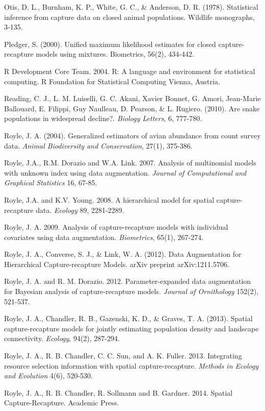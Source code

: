\documentclass{book}
\begin{document}
\rf Otis, D. L., Burnham, K. P., White, G. C., \& Anderson, D. R. (1978). Statistical inference from capture data on closed animal populations. Wildlife monographs, 3-135.

\rf Pledger, S. (2000). Unified maximum likelihood estimates for closed capture-recapture models using mixtures. Biometrics, 56(2), 434-442.

\rf R Development Core Team. 2004. R: A language and environment for statistical computing. R Foundation for Statistical Computing Vienna, Austria.

\rf Reading, C. J., L. M. Luiselli, G. C. Akani, Xavier Bonnet, G. Amori, Jean-Marie Ballouard, E. Filippi, Guy Naulleau, D. Pearson, \& L. Rugiero. (2010). Are snake populations in widespread decline?. \textit{Biology Letters}, 6, 777-780.

\rf Royle, J. A. (2004). Generalized estimators of avian abundance from count survey data. \textit{Animal Biodiversity and Conservation}, 27(1), 375-386.

\rf Royle, J.A., R.M. Dorazio and W.A. Link. 2007. Analysis of multinomial models with unknown index using data augmentation. {\it Journal of Computational and Graphical Statistics}  16, 67-85.

\rf  Royle, J.A. and K.V. Young. 2008. A hierarchical model for spatial capture-recapture data. {\it Ecology}  89, 2281-2289.

\rf Royle, J. A. 2009. Analysis of capture-recapture models with individual covariates using data augmentation. {\it Biometrics}, 65(1), 267-274.

\rf Royle, J. A., Converse, S. J., \& Link, W. A. (2012). Data Augmentation for Hierarchical Capture-recapture Models. arXiv preprint arXiv:1211.5706.

\rf Royle, J. A. and R. M. Dorazio. 2012. Parameter-expanded data augmentation for Bayesian analysis of capture-recapture models. {\it Journal of Ornithology} 152(2), 521-537.

\rf Royle, J. A., Chandler, R. B., Gazenski, K. D., \& Graves, T. A. (2013). Spatial capture-recapture models for jointly estimating population density and landscape connectivity. \textit{Ecology}, 94(2), 287-294.

\rf Royle, J. A., R. B. Chandler, C. C. Sun, and A. K. Fuller. 2013. Integrating resource selection information with spatial capture-recapture. {\it Methods in Ecology and Evolution} 4(6), 520-530.

\rf Royle, J. A., R. B. Chandler, R. Sollmann and B. Gardner. 2014. Spatial Capture-Recapture. Academic Press.
\end{document}
